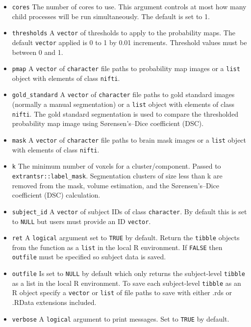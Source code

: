 \documentclass[]{article}
\providecommand{\tightlist}{%
  \setlength{\itemsep}{0pt}\setlength{\parskip}{0pt}}
\begin{document}
\begin{itemize}
\tightlist
\item
  \texttt{cores} The number of cores to use. This argument controls at
  most how many child processes will be run simultaneously. The default
  is set to 1.\\
\item
  \texttt{thresholds} A \texttt{vector} of thresholds to apply to the
  probability maps. The default \texttt{vector} applied is 0 to 1 by
  0.01 increments. Threshold values must be between 0 and 1.\\
\item
  \texttt{pmap} A \texttt{vector} of \texttt{character} file paths to
  probability map images or a \texttt{list} object with elements of
  class \texttt{nifti}.
\item
  \texttt{gold\_standard} A \texttt{vector} of \texttt{character} file
  paths to gold standard images (normally a manual segmentation) or a
  \texttt{list} object with elements of class \texttt{nifti}. The gold
  standard segmentation is used to compare the thresholded probability
  map image using Sørensen's--Dice coefficient (DSC).
\item
  \texttt{mask} A \texttt{vector} of \texttt{character} file paths to
  brain mask images or a \texttt{list} object with elements of class
  \texttt{nifti}.\\
\item
  \texttt{k} The minimum number of voxels for a cluster/component.
  Passed to \texttt{extrantsr::label\_mask}. Segmentation clusters of
  size less than k are removed from the mask, volume estimation, and the
  Sørensen's--Dice coefficient (DSC) calculation.\\
\item
  \texttt{subject\_id} A \texttt{vector} of subject IDs of class
  \texttt{character}. By default this is set to \texttt{NULL} but users
  must provide an ID \texttt{vector}.
\item
  \texttt{ret} A \texttt{logical} argument set to \texttt{TRUE} by
  default. Return the \texttt{tibble} objects from the function as a
  \texttt{list} in the local R environment. If \texttt{FALSE} then
  \texttt{outfile} must be specified so subject data is saved.
\item
  \texttt{outfile} Is set to \texttt{NULL} by default which only returns
  the subject-level \texttt{tibble} as a list in the local R
  environment. To save each subject-level \texttt{tibble} as an R object
  specify a \texttt{vector} or \texttt{list} of file paths to save with
  either .rds or .RData extensions included.
\item
  \texttt{verbose} A \texttt{logical} argument to print messages. Set to
  \texttt{TRUE} by default.
\end{itemize}
\end{document}
